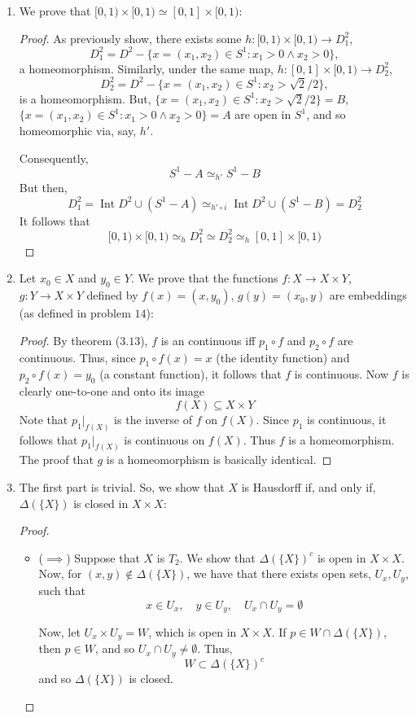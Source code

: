 \documentclass{book}
\DeclareMathOperator*{\Int}{\text{Int}}
\begin{document}
\begin{enumerate}[(1)]
    \item We prove that $[0,1) \times [0,1) \simeq [0,1] \times [0,1)$:
        \begin{proof} As previously show, there exists some $h: [0,1) \times [0,1) \rightarrow D_1^2$, 
            \[D_1^2 = D^2 - \{ x = (x_1, x_2) \in S^1 : x_1 > 0 \land x_2 > 0 \},\]
            a homeomorphism. 
            Similarly, under the same map, $h: [0,1] \times [0,1) \rightarrow D_2^2$, 
            \[D_2^2 = D^2 - \{ x = (x_1, x_2) \in S^1 :  x_2 > \sqrt{2}/2 \},\]
            is a homeomorphism. 
            But, $ \{ x = (x_1, x_2) \in S^1 :  x_2 > \sqrt{2}/2 \} = B$,  $\{ x = (x_1, x_2) \in S^1 : x_1 > 0 \land x_2 > 0 \} = A$ are open in $S^1$, and so homeomorphic via, say, $h'$. 
            \par Consequently, 
            \[ S^1 - A \simeq_{h'} S^1 - B\]
            But then, 
            \[D_1^2 = \Int D^2 \cup (S^1 - A) \simeq_{h' \circ i} \Int D^2 \cup (S^1 - B) =  D_2^2 \]
            It follows that 
            \[ [0,1) \times [0,1) \simeq_{h} D_1^2 \simeq D_2^2 \simeq_{h} [0,1] \times [0,1) \]
        \end{proof}

    \item Let $x_0\in X$ and $y_0\in Y$.  We prove that the functions $f:X\rightarrow X\times Y$, $g:Y\rightarrow X\times Y$ defined by $f(x)=(x,y_0)$, $g(y)=(x_0,y)$ are embeddings (as defined in problem $14$): 
        \begin{proof} By theorem ($3.13$), $f$ is an continuous iff $p_1\circ f$ and $p_2\circ f$ are continuous.  Thus, since $p_1 \circ f(x)=x$ (the identity function) and $p_2\circ f(x)=y_0$ (a constant function), it follows that $f$ is continuous.  Now $f$ is clearly one-to-one and onto its image 
            \[ f(X)\subseteq X\times Y\]
            Note that $p_1|_{f(X)}$ is the inverse of $f$ on $f(X)$.  Since $p_1$ is continuous, it follows that $p_1|_{f(X)}$ is continuous on $f(X)$.  Thus $f$ is a homeomorphism.  The proof that $g$ is a homeomorphism is basically identical.
        \end{proof}

    \item The first part is trivial. So, we show that $X$ is Hausdorff if, and only if, $\Delta(\{X\})$ is closed in $X \times X$: 
        \begin{proof} 
            \begin{itemize}
                \item[] ($\implies$) Suppose that $X$ is $T_2$. We show that $\Delta(\{X\}) ^ c$ is open in $X \times X$. Now, for $(x,y) \notin \Delta(\{X\})$, we have that there exists open sets, $U_x, U_y$, such that 
                    \[ x \in U_x, \quad y \in U_y, \quad U_x \cap U_y = \emptyset\] 
                    \par Now, let $U_x \times U_y = W$, which is open in $X \times X$. If $p \in W \cap \Delta(\{X\})$, then $p \in W$, and so $U_x \cap U_y \neq \emptyset$. Thus, 
                    \[W \subset \Delta(\{X\}) ^ c\]
                    and so $\Delta(\{X\})$ is closed. 


\end{itemize}
\end{proof}
\end{enumerate}
\end{document}
